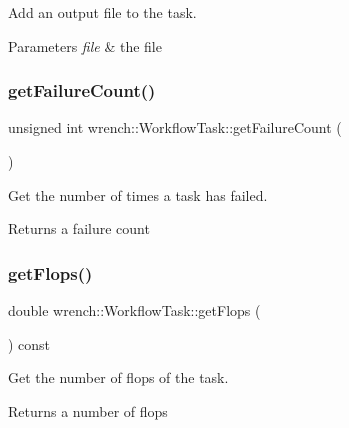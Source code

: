 Add an output file to the task. 


\begin{DoxyParams}{Parameters}
{\em file} & the file \\
\hline
\end{DoxyParams}
\mbox{\label{classwrench_1_1_workflow_task_a6103d36486855fb8caabb008bcfaacd4}} 
\subsubsection{\texorpdfstring{get\+Failure\+Count()}{getFailureCount()}}
{\footnotesize\ttfamily unsigned int wrench\+::\+Workflow\+Task\+::get\+Failure\+Count (\begin{DoxyParamCaption}{ }\end{DoxyParamCaption})}



Get the number of times a task has failed. 

\begin{DoxyReturn}{Returns}
a failure count 
\end{DoxyReturn}
\mbox{\label{classwrench_1_1_workflow_task_aec0aab3ed552960729a60d1d3c4a3de2}} 
\subsubsection{\texorpdfstring{get\+Flops()}{getFlops()}}
{\footnotesize\ttfamily double wrench\+::\+Workflow\+Task\+::get\+Flops (\begin{DoxyParamCaption}{ }\end{DoxyParamCaption}) const}



Get the number of flops of the task. 

\begin{DoxyReturn}{Returns}
a number of flops 
\end{DoxyReturn}
\mbox{\label{classwrench_1_1_workflow_task_a18ce8967b4b59d2d231a1218a8d3b813}} 
